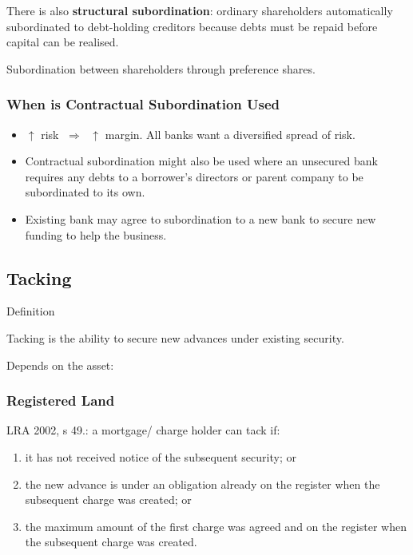 \documentclass[
]{article}
\providecommand{\tightlist}{%
  \setlength{\itemsep}{0pt}\setlength{\parskip}{0pt}}
\newenvironment{env-8872a5c8-2356-4b38-87ff-b8a967f137b3}
{
    \savenotes\tcolorbox[blanker,breakable,left=5pt,borderline west={2pt}{-4pt}{yellow}]
}
{
    \endtcolorbox\spewnotes
}
\begin{document}
There is also \textbf{structural subordination}: ordinary shareholders
automatically subordinated to debt-holding creditors because debts must
be repaid before capital can be realised.

Subordination between shareholders through preference shares.

\hypertarget{when-is-contractual-subordination-used}{%
\subsubsection{When is Contractual Subordination
Used}\label{when-is-contractual-subordination-used}}

\begin{itemize}
\tightlist
\item
  {\(\uparrow\)} risk {\(\;\Longrightarrow\;\)} {\(\uparrow\)} margin.
  All banks want a diversified spread of risk.
\item
  Contractual subordination might also be used where an unsecured bank
  requires any debts to a borrower's directors or parent company to be
  subordinated to its own.
\item
  Existing bank may agree to subordination to a new bank to secure new
  funding to help the business.
\end{itemize}

\hypertarget{tacking}{%
\subsection{Tacking}\label{tacking}}

\begin{env-8872a5c8-2356-4b38-87ff-b8a967f137b3}

Definition

Tacking is the ability to secure new advances under existing security.

\end{env-8872a5c8-2356-4b38-87ff-b8a967f137b3}

Depends on the asset:

\hypertarget{registered-land}{%
\subsubsection{Registered Land}\label{registered-land}}

LRA 2002, s 49.: a mortgage/ charge holder can tack if:

\begin{enumerate}
\tightlist
\item
  it has not received notice of the subsequent security; or
\item
  the new advance is under an obligation already on the register when
  the subsequent charge was created; or
\item
  the maximum amount of the first charge was agreed and on the register
  when the subsequent charge was created.
\end{enumerate}
\end{document}
